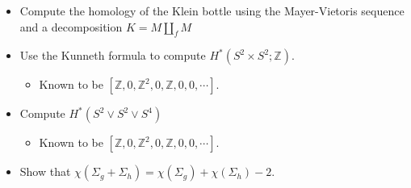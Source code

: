 \begin{itemize}
\tightlist
\item
  Compute the homology of the Klein bottle using the Mayer-Vietoris
  sequence and a decomposition \(K = M {\textstyle\coprod}_f M\)
\item
  Use the Kunneth formula to compute
  \(H^*(S^2\times S^2; {\mathbb{Z}})\).

  \begin{itemize}
  \tightlist
  \item
    Known to be
    \([{\mathbb{Z}}, 0, {\mathbb{Z}}^2, 0, {\mathbb{Z}}, 0, 0, \cdots]\).
  \end{itemize}
\item
  Compute \(H^*(S^2 \vee S^2 \vee S^4)\)

  \begin{itemize}
  \tightlist
  \item
    Known to be
    \([{\mathbb{Z}}, 0, {\mathbb{Z}}^2, 0, {\mathbb{Z}}, 0, 0, \cdots]\).
  \end{itemize}
\item
  Show that
  \(\chi(\Sigma_g + \Sigma_h) = \chi(\Sigma_g) + \chi(\Sigma_h) - 2\).
\end{itemize}



\newpage
\printbibliography[title=Bibliography]




